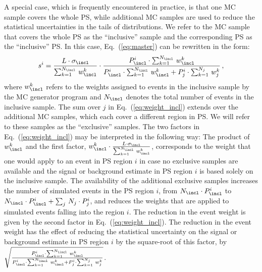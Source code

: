A special case, which is frequently encountered in practice,
is that one MC sample covers the whole PS,
while additional MC samples are used to reduce the statistical uncertainties in the tails of distributions.
We refer to the MC sample that covers the whole PS as the ``inclusive'' sample and the corresponding PS as the ``inclusive'' PS.
In this case, Eq.~(\ref{eq:master}) can be rewritten in the form:
\begin{equation}
s^{i} = \frac{L \cdot \sigma_{\incl}}{\sum_{k=1}^{N_{\incl}} \, w_{\incl}^{k}} \cdot \frac{P_{\incl}^{i} \cdot \sum_{k=1}^{N_{\incl}} \, w_{\incl}^{k}}{P_{\incl}^{i} \cdot \sum_{k=1}^{N_{\incl}} \, w_{\incl}^{k} + P_{j}^{i} \cdot \sum_{k=1}^{N_{j}} \, w_{j}^{k}} \, ,
\label{eq:weight_incl}
\end{equation}
where $w_{\incl}^{k}$ refers to the weights assigned to events in the inclusive sample by the MC generator program and $N_{\incl}$ denotes the total number of events in the inclusive sample.
The sum over $j$ in Eq.~(\ref{eq:weight_incl}) extends over the additional MC samples, which each cover a different region in PS.
We will refer to these samples as the ``exclusive'' samples.
The two factors in Eq.~(\ref{eq:weight_incl}) may be interpreted in the following way:
The product of $w_{\incl}^{k}$ and the first factor, $w_{\incl}^{k} \cdot \frac{L \cdot \sigma_{\incl}}{\sum_{k=1}^{N_{\incl}} \, w_{\incl}^{k}}$,
corresponds to the weight that one would apply to an event in PS region $i$ 
in case no exclusive samples are available and the signal or background estimate in PS region $i$ is based solely on the inclusive sample.
The availability of the additional exclusive samples increases the number of simulated events in the PS region $i$, 
from $N_{\incl} \cdot P_{\incl}^{i}$ to $N_{\incl} \cdot P_{\incl}^{i} + \sum_{j} \, N_{j} \cdot P_{j}^{i}$,
and reduces the weights that are applied to simulated events falling into the region $i$.
The reduction in the event weight is given by the second factor in Eq.~(\ref{eq:weight_incl}).
The reduction in the event weight has the effect of reducing the statistical uncertainty on the signal or background estimate in PS region $i$
by the square-root of this factor,
\ie by $\sqrt{\frac{P_{\incl}^{i} \cdot \sum_{k=1}^{N_{\incl}} \, w_{\incl}^{k}}{P_{\incl}^{i} \cdot \sum_{k=1}^{N_{\incl}} \, w_{\incl}^{k} + P_{j}^{i} \cdot \sum_{k=1}^{N_{j}} \, w_{j}^{k}}}$.
